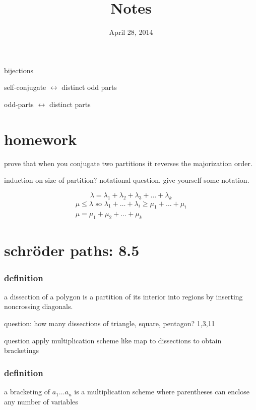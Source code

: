 \documentclass{article}
\begin{document}
\title{Notes}
\date{April 28, 2014}
\maketitle
bijections

self-conjugate $\leftrightarrow$ distinct odd parts

odd-parts $\leftrightarrow$ distinct parts

\section*{homework}
prove that when you conjugate two partitions it reverses the majorization order.

induction on size of partition? notational question. give yourself some notation.

\[\lambda=\lambda_1+\lambda_2+\lambda_3+\dots+\lambda_k\]
\begin{align*}
  \mu\le\lambda\text{ so } \lambda_1+\dots+\lambda_i\ge\mu_1+\dots+\mu_i\\
  \mu=\mu_1+\mu_2+\dots+\mu_k
\end{align*}
\section*{schr\"{o}der paths: 8.5}
\subsubsection*{definition}
a dissection of a polygon is a partition of its interior into regions by inserting noncrossing diagonals.

question: how many dissections of triangle, square, pentagon? 1,3,11

question apply multiplication scheme like map to dissections to obtain bracketings

\subsubsection*{definition}
a bracketing of $a_1\dots a_n$ is a multiplication scheme where parentheses can enclose any  number of variables
\end{document}
